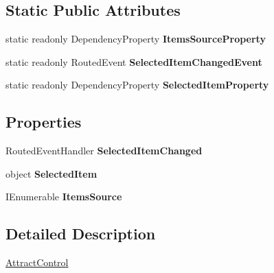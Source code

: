 \subsection*{Static Public Attributes}
\begin{DoxyCompactItemize}
\item 
static readonly Dependency\-Property {\bfseries Items\-Source\-Property}
\item 
static readonly Routed\-Event {\bfseries Selected\-Item\-Changed\-Event}
\item 
static readonly Dependency\-Property {\bfseries Selected\-Item\-Property}
\end{DoxyCompactItemize}
\subsection*{Properties}
\begin{DoxyCompactItemize}
\item 
\hypertarget{class_microsoft_1_1_samples_1_1_kinect_1_1_basic_interactions_1_1_attract_control_ab8abbafcb1bb1ac00297c4c12d6b83fe}{Routed\-Event\-Handler {\bfseries Selected\-Item\-Changed}}\label{class_microsoft_1_1_samples_1_1_kinect_1_1_basic_interactions_1_1_attract_control_ab8abbafcb1bb1ac00297c4c12d6b83fe}

\item 
\hypertarget{class_microsoft_1_1_samples_1_1_kinect_1_1_basic_interactions_1_1_attract_control_a14834677d6401c7d6661213692a89a9b}{object {\bfseries Selected\-Item}}\label{class_microsoft_1_1_samples_1_1_kinect_1_1_basic_interactions_1_1_attract_control_a14834677d6401c7d6661213692a89a9b}

\item 
\hypertarget{class_microsoft_1_1_samples_1_1_kinect_1_1_basic_interactions_1_1_attract_control_ae8e5b6af57aa774fe9912f126eb5f2c7}{I\-Enumerable {\bfseries Items\-Source}}\label{class_microsoft_1_1_samples_1_1_kinect_1_1_basic_interactions_1_1_attract_control_ae8e5b6af57aa774fe9912f126eb5f2c7}

\end{DoxyCompactItemize}


\subsection{Detailed Description}
\hyperlink{class_microsoft_1_1_samples_1_1_kinect_1_1_basic_interactions_1_1_attract_control}{Attract\-Control} 

